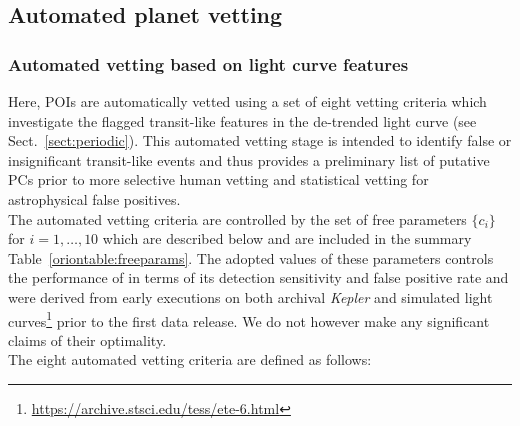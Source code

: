 \subsection{Automated planet vetting} \label{sect:vetting}
\subsubsection{Automated vetting based on light curve features} \label{sect:autovetting}
Here, POIs are automatically vetted using a set of eight vetting criteria which investigate
the flagged transit-like features in the de-trended light curve (see Sect.~\ref{sect:periodic}).
This automated vetting stage is intended to identify false or insignificant transit-like events
and thus provides a preliminary list of putative PCs prior to more selective human vetting
and statistical vetting for astrophysical false positives. \\

The automated vetting criteria are controlled by the set of free parameters
$\{c_i\}$ for $i=1,\dots,10$ which are described below and are included in the
summary Table~\ref{oriontable:freeparams}.
The adopted values of these parameters controls the performance of \pipeline{} in terms of its
detection sensitivity and false positive rate and were derived
from early \pipeline{} executions on both archival \emph{Kepler} and simulated \tess{} light
curves\footnote{\url{https://archive.stsci.edu/tess/ete-6.html}} prior to the first \tess{} data
release. We do not however make any significant claims of their optimality. \\

The eight automated vetting criteria are defined as follows:

